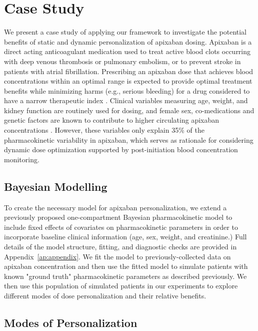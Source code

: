 \section{Case Study}\label{ss:casestudy}

We present a case study of applying our framework to investigate the potential benefits of static and dynamic personalization of apixaban dosing. Apixaban is a direct acting anticoagulant medication used to treat active blood clots occurring with deep venous thrombosis or pulmonary embolism, or to prevent stroke in patients with atrial fibrillation. Prescribing an apixaban dose that achieves blood concentrations within an optimal range is expected to provide optimal treatment benefits while minimizing harms (e.g., serious bleeding) for a drug considered to have a narrow therapeutic index . Clinical variables measuring age, weight, and kidney function are routinely used for dosing, and female sex, co-medications and genetic factors are known to contribute to higher circulating apixaban concentrations \cite{gulilat2020drug}. However, these variables only explain 35\% of the pharmacokinetic variability in apixaban, which serves as rationale for considering dynamic dose optimization supported by post-initiation blood concentration monitoring. 

\subsection{Bayesian Modelling}

To create the necessary model for apixaban personalization, we extend a previously proposed one-compartment Bayesian pharmacokinetic model \cite{pananos2020comparisons} to include fixed effects of covariates on pharmacokinetic parameters in order to incorporate baseline clinical information (age, sex, weight, and creatinine.)  Full details of the model structure, fitting, and diagnostic checks are provided in Appendix~\ref{ap:appendix}. We fit the model to previously-collected data on apixaban concentration \cite{tirona2018apixaban} and then use the fitted model to simulate patients with known "ground truth" pharmacokinetic parameters as described previously. We then use this population of simulated patients in our experiments to explore different modes of dose personalization and their relative benefits.

\subsection{Modes of Personalization}

